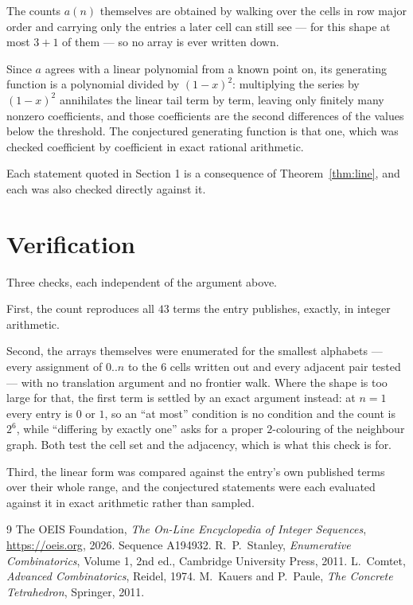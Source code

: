 \documentclass[11pt,a4paper]{article}
\theoremstyle{plain}
\theoremstyle{definition}
\begin{document}
The counts $a(n)$ themselves are obtained by walking over the cells in row major order and
carrying only the entries a later cell can still see --- for this shape at most $3+1$ of
them --- so no array is ever written down.

Since $a$ agrees with a linear polynomial from a known point on, its generating function is a
polynomial divided by $(1-x)^2$: multiplying the series by $(1-x)^2$ annihilates the linear
tail term by term, leaving only finitely many nonzero coefficients, and those coefficients are
the second differences of the values below the threshold. The conjectured generating function
is that one, which was checked coefficient by coefficient in exact rational arithmetic.

Each statement quoted in Section 1 is a consequence of Theorem~\ref{thm:line}, and each was
also checked directly against it.

\section{Verification}

Three checks, each independent of the argument above.

First, the count reproduces all $43$ terms the entry publishes, exactly, in integer
arithmetic.

Second, the arrays themselves were enumerated for the smallest alphabets --- every assignment
of $0..n$ to the $6$ cells written out and every adjacent pair tested --- with no
translation argument and no frontier walk. Where the shape is too large for that, the first
term is settled by an exact argument instead: at $n=1$ every entry is $0$ or $1$, so an ``at
most'' condition is no condition and the count is $2^{6}$, while ``differing by exactly
one'' asks for a proper $2$-colouring of the neighbour graph. Both test the cell set and the
adjacency, which is what this check is for.

Third, the linear form was compared against the entry's own published terms over their whole
range, and the conjectured statements were each evaluated against it in exact arithmetic
rather than sampled.

\begin{thebibliography}{9}
 The OEIS Foundation, \emph{The On-Line Encyclopedia of Integer
Sequences}, \url{https://oeis.org}, 2026. Sequence A194932.
 R.~P.~Stanley, \emph{Enumerative Combinatorics}, Volume 1, 2nd ed.,
Cambridge University Press, 2011.
 L.~Comtet, \emph{Advanced Combinatorics}, Reidel, 1974.
 M.~Kauers and P.~Paule, \emph{The Concrete Tetrahedron}, Springer, 2011.
\end{thebibliography}
\end{document}
